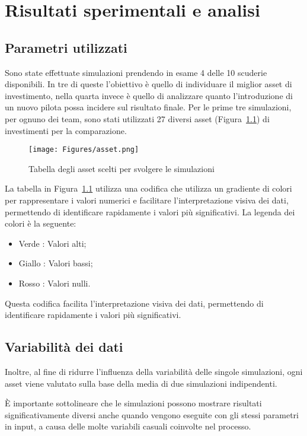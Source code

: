 \chapter{Risultati sperimentali e analisi}

\section{Parametri utilizzati}
Sono state effettuate simulazioni prendendo in esame 4 delle 10 scuderie disponibili. In tre di queste l’obiettivo è quello di individuare il miglior asset di investimento, nella quarta invece è quello di analizzare quanto l’introduzione di un nuovo pilota possa incidere sul risultato finale. 
Per le prime tre simulazioni, per ognuno dei team, sono stati utilizzati 27 diversi asset (Figura~\ref{fig:asset}) di investimenti per la comparazione. 
 
\begin{figure}[H]
    \centering
\texttt{[image: Figures/asset.png]} 
    \caption{Tabella degli asset scelti per svolgere le simulazioni}
    \label{fig:asset}
\end{figure}

La tabella in Figura~\ref{fig:asset} utilizza una codifica che utilizza un gradiente di colori per rappresentare i valori numerici e facilitare l'interpretazione visiva dei dati, permettendo di identificare rapidamente i valori più significativi. La legenda dei colori è la seguente:
\begin{itemize}
    \item Verde : Valori alti;
    \item Giallo : Valori bassi;
    \item Rosso : Valori nulli.
\end{itemize}
Questa codifica facilita l'interpretazione visiva dei dati, permettendo di identificare rapidamente i valori più significativi.

\newpage

\section{Variabilità dei dati}
Inoltre, al fine di ridurre l'influenza della variabilità delle singole simulazioni, ogni asset viene valutato sulla base della media di due simulazioni indipendenti.

È importante sottolineare che le simulazioni possono mostrare risultati significativamente diversi anche quando vengono eseguite con gli stessi parametri in input, a causa delle molte variabili casuali coinvolte nel processo.

